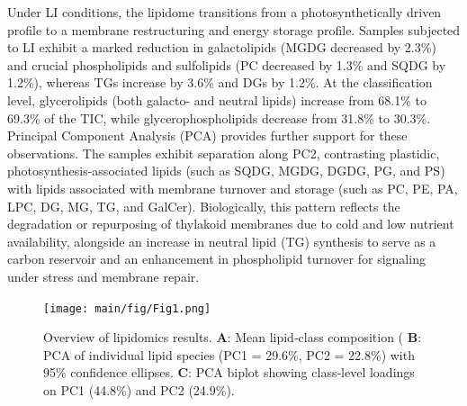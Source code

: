 \documentclass[10pt,letterpaper]{article}
\begin{document}
Under LI conditions, the lipidome transitions from a photosynthetically driven profile to a membrane restructuring and energy storage profile. Samples subjected to LI exhibit a marked reduction in galactolipids (MGDG decreased by 2.3\%) and crucial phospholipids and sulfolipids (PC decreased by 1.3\% and SQDG by 1.2\%), whereas TGs increase by 3.6\% and DGs by 1.2\%. At the classification level, glycerolipids (both galacto- and neutral lipids) increase from 68.1\% to 69.3\% of the TIC, while glycerophospholipids decrease from 31.8\% to 30.3\%. Principal Component Analysis (PCA) provides further support for these observations. The samples exhibit separation along PC2, contrasting plastidic, photosynthesis-associated lipids (such as SQDG, MGDG, DGDG, PG, and PS) with lipids associated with membrane turnover and storage (such as PC, PE, PA, LPC, DG, MG, TG, and GalCer). Biologically, this pattern reflects the degradation or repurposing of thylakoid membranes due to cold and low nutrient availability, alongside an increase in neutral lipid (TG) synthesis to serve as a carbon reservoir and an enhancement in phospholipid turnover for signaling under stress and membrane repair.


\begin{figure}[htbp]
  \centering
  \texttt{[image: main/fig/Fig1.png]}
  \caption{Overview of lipidomics results.  
    \textbf{A}: Mean lipid‐class composition (%
    \textbf{B}: PCA of individual lipid species (PC1 = 29.6\%, PC2 = 22.8\%) with 95\% confidence ellipses.  
    \textbf{C}: PCA biplot showing class‐level loadings on PC1 (44.8\%) and PC2 (24.9\%).}
  \label{fig:Fig1_combined}
\end{figure}
\end{document}
